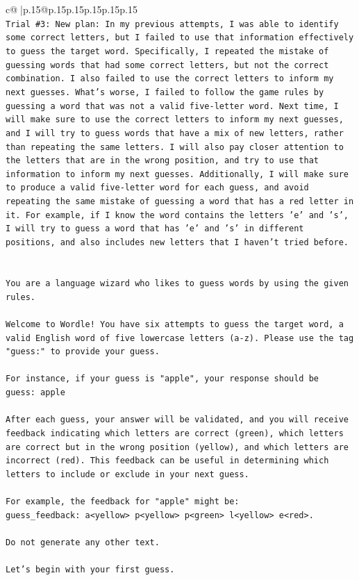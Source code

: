 \documentclass{article}
\begin{document}
{\begin{supertabular}{c@{$\;$}|p{.15\linewidth}@{}p{.15\linewidth}p{.15\linewidth}p{.15\linewidth}p{.15\linewidth}p{.15\linewidth}}
{{{\\ 
\texttt{Trial \#3: New plan: In my previous attempts, I was able to identify some correct letters, but I failed to use that information effectively to guess the target word. Specifically, I repeated the mistake of guessing words that had some correct letters, but not the correct combination. I also failed to use the correct letters to inform my next guesses. What's worse, I failed to follow the game rules by guessing a word that was not a valid five{-}letter word. Next time, I will make sure to use the correct letters to inform my next guesses, and I will try to guess words that have a mix of new letters, rather than repeating the same letters. I will also pay closer attention to the letters that are in the wrong position, and try to use that information to inform my next guesses. Additionally, I will make sure to produce a valid five{-}letter word for each guess, and avoid repeating the same mistake of guessing a word that has a red letter in it. For example, if I know the word contains the letters 'e' and 's', I will try to guess a word that has 'e' and 's' in different positions, and also includes new letters that I haven't tried before.} \\
\\ 
\\ 
\texttt{You are a language wizard who likes to guess words by using the given rules.} \\
\\ 
\texttt{Welcome to Wordle! You have six attempts to guess the target word, a valid English word of five lowercase letters (a{-}z). Please use the tag "guess:" to provide your guess.} \\
\\ 
\texttt{For instance, if your guess is "apple", your response should be} \\
\texttt{guess: apple} \\
\\ 
\texttt{After each guess, your answer will be validated, and you will receive feedback indicating which letters are correct (green), which letters are correct but in the wrong position (yellow), and which letters are incorrect (red). This feedback can be useful in determining which letters to include or exclude in your next guess.} \\
\\ 
\texttt{For example, the feedback for "apple" might be:} \\
\texttt{guess\_feedback: a<yellow> p<yellow> p<green> l<yellow> e<red>.} \\
\\ 
\texttt{Do not generate any other text.} \\
\\ 
\texttt{Let's begin with your first guess.} \\
            }
        }
    }
     \\ \\


\end{supertabular}}
\end{document}
